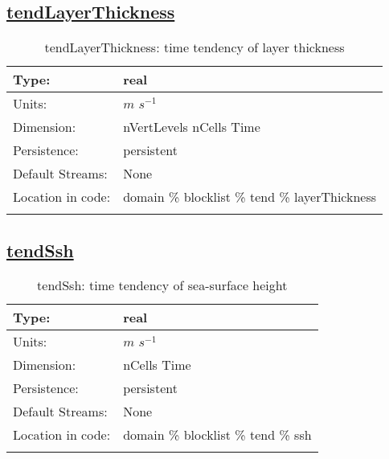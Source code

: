 \subsection[tendLayerThickness]{\hyperref[sec:var_tab_tend]{tendLayerThickness}}
\label{subsec:var_sec_tend_tendLayerThickness}
\begin{center}
\begin{longtable}{| p{2.0in} | p{4.0in} |}
        \hline 
        Type: & real \\
        \hline 
        Units: & $m$ $s^{-1}$ \\
        \hline 
        Dimension: & nVertLevels nCells Time \\
        \hline 
        Persistence: & persistent \\
        \hline 
		 Default Streams: & None \\
        \hline 
		 Location in code: & domain \% blocklist \% tend \% layerThickness \\
		 \hline 
    \caption{tendLayerThickness: time tendency of layer thickness}
\end{longtable}
\end{center}
\subsection[tendSsh]{\hyperref[sec:var_tab_tend]{tendSsh}}
\label{subsec:var_sec_tend_tendSsh}
\begin{center}
\begin{longtable}{| p{2.0in} | p{4.0in} |}
        \hline 
        Type: & real \\
        \hline 
        Units: & $m$ $s^{-1}$ \\
        \hline 
        Dimension: & nCells Time \\
        \hline 
        Persistence: & persistent \\
        \hline 
		 Default Streams: & None \\
        \hline 
		 Location in code: & domain \% blocklist \% tend \% ssh \\
		 \hline 
    \caption{tendSsh: time tendency of sea-surface height}
\end{longtable}
\end{center}
